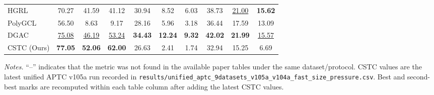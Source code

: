 \begin{table}[t]
{\begin{tabular}{lccccccccc}
HGRL & 70.27 & 41.59 & 41.12 & 30.94 & 8.52 & 6.03 & 38.73 & \underline{21.00} & \textbf{15.62} \\
PolyGCL & 56.50 & 8.63 & 9.17 & 28.16 & 5.96 & 3.18 & 36.44 & 17.59 & 13.09 \\
DGAC & \underline{75.08} & \underline{46.19} & \underline{53.24} & \textbf{34.43} & \textbf{12.24} & \textbf{9.32} & \textbf{42.02} & \textbf{21.99} & \underline{15.57} \\
CSTC (Ours) & \textbf{77.05} & \textbf{52.06} & \textbf{62.00} & 26.63 & 2.41 & 1.74 & 32.94 & 15.25 & 6.69 \\
\bottomrule
\end{tabular}%
}
\end{table}

\noindent\footnotesize\textit{Notes.} ``--'' indicates that the metric was not found in the available paper tables under the same dataset/protocol. CSTC values are the latest unified APTC v105a run recorded in \texttt{results/unified\_aptc\_9datasets\_v105a\_v104a\_fast\_size\_pressure.csv}. Best and second-best marks are recomputed within each table column after adding the latest CSTC values.
